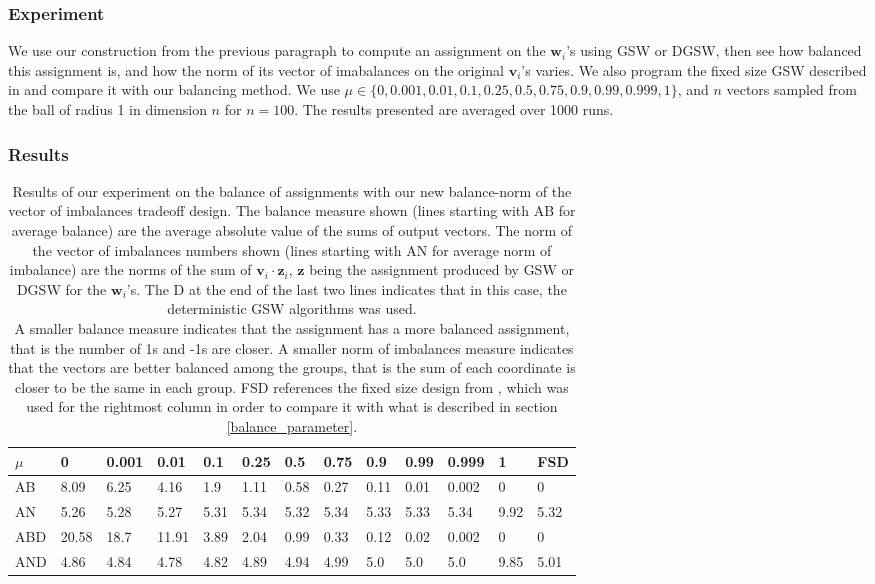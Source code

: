 \documentclass[12pt]{article}
\begin{document}
\subsubsection{Experiment}
We use our construction from the previous paragraph to compute an assignment on the $\textbf{w}_i$'s using GSW or DGSW, then see how balanced this assignment is, and how the norm of its vector of imabalances on the original $\textbf{v}_i$'s varies. We also program the fixed size GSW described in \cite{harshaw2019balancing} and compare it with our balancing method. We use $\mu\in\{0,0.001,0.01,0.1,0.25,0.5,0.75,0.9,0.99,0.999,1\}$, and $n$ vectors sampled from the ball of radius 1 in dimension $n$ for $n=100$. The results presented are averaged over 1000 runs.

\subsubsection{Results}
\begin{table}[h!]
\centering
\caption{Results of our experiment on the balance of assignments with our new balance-norm of the vector of imbalances tradeoff design. The balance measure shown (lines starting with AB for average balance) are the average absolute value of the sums of output vectors. The norm of the vector of imbalances numbers shown (lines starting with AN for average norm of imbalance) are the norms of the sum of $\textbf{v}_i\cdot \textbf{z}_i$, $\textbf{z}$ being the assignment produced by GSW or DGSW for the $\textbf{w}_i$'s. %
The D at the end of the last two lines indicates that in this case, the deterministic GSW algorithms was used.\\
A smaller balance measure indicates that the assignment has a more balanced assignment, that is the number of 1s and -1s are closer. A smaller norm of imbalances measure indicates that the vectors are better balanced among the groups, that is the sum of each coordinate is closer to be the same in each group. FSD references the fixed size design from \cite{harshaw2019balancing}, which was used for the rightmost column in order to compare it with what is described in section \ref{balance_parameter}.}
\begin{tabular}{l|llllllllllll}
 $\mu$ &0&0.001&0.01&0.1&0.25&0.5&0.75&0.9&0.99&0.999&1&FSD\\
\hline
AB&8.09&6.25&4.16&1.9&1.11&0.58&0.27&0.11&0.01&0.002&0&0 \\
AN&5.26&5.28&5.27&5.31&5.34&5.32&5.34&5.33&5.33&5.34&9.92&5.32\\
ABD&20.58&18.7&11.91&3.89&2.04&0.99&0.33&0.12&0.02&0.002&0&0\\
AND&4.86&4.84&4.78&4.82&4.89&4.94&4.99&5.0&5.0&5.0&9.85&5.01
\end{tabular}
\label{balance_tradeoff_results}
\end{table}
\end{document}
